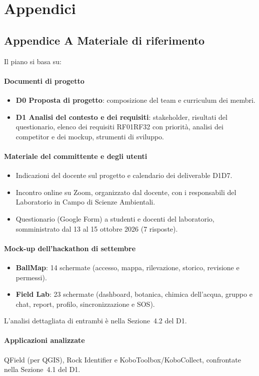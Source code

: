\section*{Appendici}

\subsection*{Appendice A  Materiale di riferimento}
Il piano si basa su: 

\paragraph{Documenti di progetto}
\begin{itemize}
    \item \textbf{D0  Proposta di progetto}: composizione del team e curriculum dei membri.
    \item \textbf{D1  Analisi del contesto e dei requisiti}: stakeholder, risultati del questionario, elenco dei requisiti RF01RF32 con priorità, analisi dei competitor e dei mockup, strumenti di sviluppo.
\end{itemize}

\paragraph{Materiale del committente e degli utenti}
\begin{itemize}
    \item Indicazioni del docente sul progetto e calendario dei deliverable D1D7.
    \item Incontro online su Zoom, organizzato dal docente, con i responsabili del Laboratorio in Campo di Scienze Ambientali.
    \item Questionario (Google Form) a studenti e docenti del laboratorio, somministrato dal 13 al 15 ottobre 2026 (7 risposte).
\end{itemize}

\paragraph{Mock-up dell'hackathon di settembre}
\begin{itemize}
    \item \textbf{BallMap}: 14 schermate (accesso, mappa, rilevazione, storico, revisione e permessi).
    \item \textbf{Field Lab}: 23 schermate (dashboard, botanica, chimica dell'acqua, gruppo e chat, report, profilo, sincronizzazione e SOS).
\end{itemize}
L'analisi dettagliata di entrambi è nella Sezione~4.2 del D1.

\paragraph{Applicazioni analizzate}
QField (per QGIS), Rock Identifier e KoboToolbox/KoboCollect, confrontate nella Sezione~4.1 del D1.


